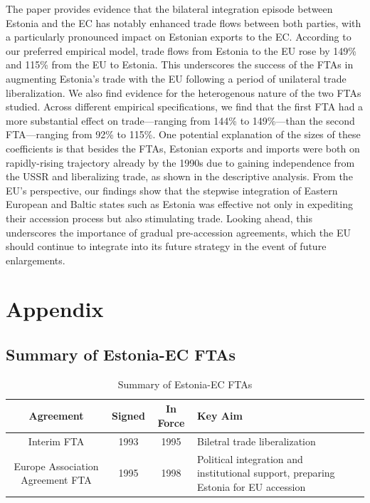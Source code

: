 \documentclass[a4paper,10pt]{article}
\begin{document}
The paper provides evidence that the bilateral integration episode between Estonia and the EC has notably enhanced trade flows between both parties, with a particularly pronounced impact on Estonian exports to the EC. According to our preferred empirical model, trade flows from Estonia to the EU rose by 149\% and 115\% from the EU to Estonia. This underscores the success of the FTAs in augmenting Estonia’s trade with the EU following a period of unilateral trade liberalization. We also find evidence for the heterogenous nature of the two FTAs studied. Across different empirical specifications, we find that the first FTA had a more substantial effect on trade—ranging from 144\% to 149\%---than the second FTA---ranging from 92\% to 115\%. One potential explanation of the sizes of these coefficients is that besides the FTAs, Estonian exports and imports were both on rapidly-rising trajectory already by the 1990s due to gaining independence from the USSR and liberalizing trade, as shown in the descriptive analysis. From the EU's perspective, our findings show that the stepwise integration of Eastern European and Baltic states such as Estonia was effective not only in expediting their accession process but also stimulating trade. Looking ahead, this underscores the importance of gradual pre-accession agreements, which the EU should continue to integrate into its future strategy in the event of future enlargements.

\newpage



\newpage

\appendix
\section{Appendix}

\subsection{Summary of Estonia-EC FTAs} \label{appendix_summary}

\begin{table}[htbp]
	\centering
	\renewcommand{\arraystretch}{2} %
	\begin{tabular}{ccc p{4.5cm}}
		\hline
		\textbf{Agreement} & \textbf{Signed} & \textbf{In Force} & \textbf{Key Aim} \\ \hline
		Interim FTA & 1993 & 1995 & Biletral trade liberalization \\ \hline
		Europe Association Agreement FTA & 1995 & 1998 & Political integration and institutional support, preparing Estonia for EU accession \\ \hline
	\end{tabular}
	\caption{Summary of Estonia-EC FTAs}
	\label{tab:trade_agreements}
\end{table}
\end{document}
